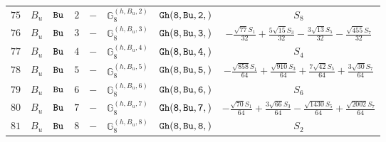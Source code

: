 \documentclass[fleqn,8pt]{jsarticle}
\begin{document}
\begin{table}[ht!]
\begin{center}
\begin{tabular}{cccccccc}
$ 75 $ & $ B_{u} $ & $ {\tt Bu} $ & $ 2 $ & $ - $ & $ \mathbb{G}_{8}^{(h,B_{u},2)} $ & $ {\tt Gh(8,Bu,2,)} $ & $ S_{8} $ \\
$ 76 $ & $ B_{u} $ & $ {\tt Bu} $ & $ 3 $ & $ - $ & $ \mathbb{G}_{8}^{(h,B_{u},3)} $ & $ {\tt Gh(8,Bu,3,)} $ & $ - \frac{\sqrt{77} S_{1}}{32} + \frac{5 \sqrt{15} S_{3}}{32} - \frac{3 \sqrt{13} S_{5}}{32} - \frac{\sqrt{455} S_{7}}{32} $ \\
$ 77 $ & $ B_{u} $ & $ {\tt Bu} $ & $ 4 $ & $ - $ & $ \mathbb{G}_{8}^{(h,B_{u},4)} $ & $ {\tt Gh(8,Bu,4,)} $ & $ S_{4} $ \\
$ 78 $ & $ B_{u} $ & $ {\tt Bu} $ & $ 5 $ & $ - $ & $ \mathbb{G}_{8}^{(h,B_{u},5)} $ & $ {\tt Gh(8,Bu,5,)} $ & $ - \frac{\sqrt{858} S_{1}}{64} + \frac{\sqrt{910} S_{3}}{64} + \frac{7 \sqrt{42} S_{5}}{64} + \frac{3 \sqrt{30} S_{7}}{64} $ \\
$ 79 $ & $ B_{u} $ & $ {\tt Bu} $ & $ 6 $ & $ - $ & $ \mathbb{G}_{8}^{(h,B_{u},6)} $ & $ {\tt Gh(8,Bu,6,)} $ & $ S_{6} $ \\
$ 80 $ & $ B_{u} $ & $ {\tt Bu} $ & $ 7 $ & $ - $ & $ \mathbb{G}_{8}^{(h,B_{u},7)} $ & $ {\tt Gh(8,Bu,7,)} $ & $ - \frac{\sqrt{70} S_{1}}{64} + \frac{3 \sqrt{66} S_{3}}{64} - \frac{\sqrt{1430} S_{5}}{64} + \frac{\sqrt{2002} S_{7}}{64} $ \\
$ 81 $ & $ B_{u} $ & $ {\tt Bu} $ & $ 8 $ & $ - $ & $ \mathbb{G}_{8}^{(h,B_{u},8)} $ & $ {\tt Gh(8,Bu,8,)} $ & $ S_{2} $ \\
 \hline \hline
\end{tabular}
\end{center}
\end{table}
\end{document}
